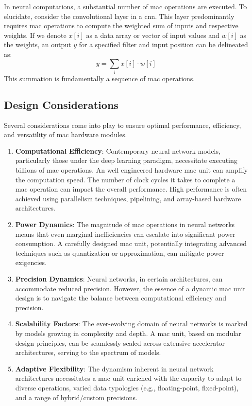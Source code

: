 In neural computations, a substantial number of \gls{mac} operations are executed. To elucidate, consider the convolutional layer in a \gls{cnn}. This layer predominantly requires \gls{mac} operations to compute the weighted sum of inputs and respective weights. If we denote \( x[i] \) as a data array or vector of input values and \( w[i] \) as the weights, an output \( y \) for a specified filter and input position can be delineated as:
\begin{equation}
y = \sum_{i} x[i] \cdot w[i]
\end{equation}
This summation is fundamentally a sequence of \gls{mac} operations.

\subsection{Design Considerations}
Several considerations come into play to ensure optimal performance, efficiency, and versatility of \gls{mac} hardware modules.

\begin{enumerate}
	\item \textbf{Computational Efficiency}: Contemporary neural network models, particularly those under the deep learning paradigm, necessitate executing billions of \gls{mac} operations. An well engineered hardware \gls{mac} unit can amplify the computation speed. The number of clock cycles it takes to complete a \gls{mac} operation can impact the overall performance. High performance is often achieved using parallelism techniques, pipelining, and array-based hardware architectures.
	
	\item \textbf{Power Dynamics}: The magnitude of \gls{mac} operations in neural networks means that even marginal inefficiencies can escalate into significant power consumption. A carefully designed \gls{mac} unit, potentially integrating advanced techniques such as quantization or approximation, can mitigate power exigencies.
	
	\item \textbf{Precision Dynamics}: Neural networks, in certain architectures, can accommodate reduced precision. However, the essence of a dynamic \gls{mac} unit design is to navigate the balance between computational efficiency and precision.
	
	\item \textbf{Scalability Factors}: The ever-evolving domain of neural networks is marked by models growing in complexity and depth. A \gls{mac} unit, based on modular design principles, can be seamlessly scaled across extensive accelerator architectures, serving to the spectrum of models.
	
	\item \textbf{Adaptive Flexibility}: The dynamism inherent in neural network architectures necessitates a \gls{mac} unit enriched with the capacity to adapt to diverse operations, varied data typologies (e.g., floating-point, fixed-point), and a range of hybrid/custom precisions.
\end{enumerate}

